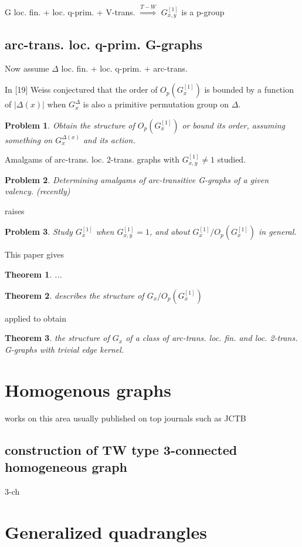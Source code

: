 \documentclass[a4,11pt]{article}
\newtheorem{theorem}{Theorem}[section]
\newtheorem{problem}{Problem}[section]
\begin{document}
\centerline{
G loc. fin. + loc. q-prim. + V-trans. $\mathop{\Longrightarrow}\limits^{T-W}$ $G_{x,y}^{[1]}$ is a p-group}

\subsection{arc-trans. loc. q-prim. G-graphs}

Now assume $\Delta$ loc. fin. + loc. q-prim. + arc-trans.


In [19] Weiss conjectured that the order of $O_p(G_x^{[1]})$ is bounded by a function of $|\Delta(x)|$ when $G_x^\Delta$ is also a primitive permutation group on $\Delta$.

\begin{problem}
	Obtain the structure of $O_p(G_x^{[1]})$ or bound its order, assuming something on $G_x^{\Delta(x)}$ and its action.
\end{problem}

Amalgams of arc-trans. loc. 2-trans. graphs with $G_{x,y}^{[1]}\neq 1$ studied.

\begin{problem}
	Determining amalgams of arc-transitive G-graphs of a given valency. (recently)
\end{problem}

raises
\begin{problem}
	Study $G_x^{[1]}$ when $G_{x,y}^{[1]}= 1$, and about $G_x^{[1]}/O_p(G_x^{[1]})$ in general.
\end{problem}

This paper gives
\begin{theorem}
	...
\end{theorem}
\begin{theorem}
	describes the structure of $G_x/O_p(G_x^{[1]})$
\end{theorem}
applied to obtain 
\begin{theorem}
	the structure of $G_x$ of a class of arc-trans. loc. fin. and loc. 2-trans. G-graphs with trivial edge kernel.
\end{theorem}


\section{Homogenous graphs}
works on this area usually published on top journals such as JCTB
\subsection{construction of TW type 3-connected homogeneous graph}
3-ch



\section{Generalized quadrangles}
\end{document}
